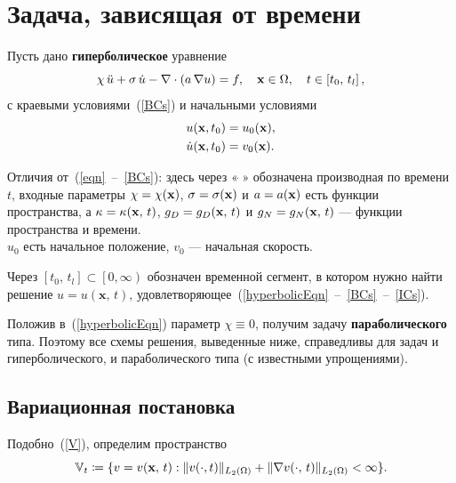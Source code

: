 
\section{Задача, зависящая от времени}
\label{timeDependent}

Пусть дано \textbf{гиперболическое} уравнение
\begin{equation}
\label{hyperbolicEqn}
	\chi \, \ddot{u} + \sigma \, \dot{u} - \nabla \cdot (a \, \nabla u) = f, \quad \boldsymbol{\mathbf{x}} \in \Omega, \quad t \in \left[ t_0, \, t_l \right],
\end{equation}
с краевыми условиями~(\ref{BCs}) и начальными условиями
\begin{subequations}
\label{ICs}
	\begin{align}
		u(\boldsymbol{\mathbf{x}}, t_0) &= u_0(\boldsymbol{\mathbf{x}}), \\
		\dot{u}(\boldsymbol{\mathbf{x}}, t_0) &= v_0(\boldsymbol{\mathbf{x}}).
	\end{align}
\end{subequations}

Отличия от~(\ref{eqn}~--~\ref{BCs}): здесь через «\,$\dot{}$\,» обозначена производная по времени $t$, входные параметры $\chi = \chi(\boldsymbol{\mathbf{x}})$, $\sigma = \sigma(\boldsymbol{\mathbf{x}})$ и $a = a(\boldsymbol{\mathbf{x}})$ есть функции пространства, а $\kappa = \kappa(\boldsymbol{\mathbf{x}}, \, t)$, $g_D = g_D(\boldsymbol{\mathbf{x}}, \, t)$ и $g_N = g_N(\boldsymbol{\mathbf{x}}, \, t)$ --- функции пространства и времени.\\
$u_0$ есть начальное положение, $v_0$ --- начальная скорость.

Через $\left[ t_0, \, t_l \right] \subset \left[ 0, \infty \right) $ обозначен временной сегмент, в котором нужно найти решение $u = u(\textbf{x}, \, t)$, удовлетворяющее~(\ref{hyperbolicEqn}~--~\ref{BCs}~--~\ref{ICs}).

Положив в~(\ref{hyperbolicEqn}) параметр $\chi \equiv 0$, получим задачу \textbf{параболического} типа. Поэтому все схемы решения, выведенные ниже, справедливы для задач и гиперболического, и параболического типа (с известными упрощениями).

\subsection{Вариационная постановка}

Подобно~(\ref{V}), определим пространство
\begin{equation}
\label{Vt}
	\mathbb{V}_t \coloneqq \{ v = v(\vect{x}, \, t): \normL{v(\cdot, t)} + \normL{\nabla v(\cdot, \, t)} < \infty \}.
\end{equation}

